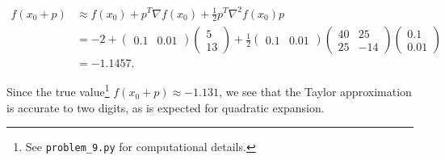 \begin{solution}
  \begin{align*}
    f(x_0 + p) &\approx f(x_0) + p^T \nabla f(x_0) + \frac{1}{2} p^T \nabla^2 f(x_0) p \\
               &= -2 + \begin{pmatrix}
                0.1 & 0.01
              \end{pmatrix}
              \begin{pmatrix}
                5 \\
                13
              \end{pmatrix} + \frac{1}{2} \begin{pmatrix}
                0.1 & 0.01
              \end{pmatrix}
              \begin{pmatrix}
                40 &  25 \\
                25 & -14
              \end{pmatrix}
              \begin{pmatrix}
                0.1 \\
                0.01
              \end{pmatrix} \\
              & = -1.1457.
  \end{align*}

  Since the true value\footnote{
    See \texttt{problem\_9.py} for computational details.
  } $f(x_0 + p) \approx -1.131 $, we see that the Taylor approximation is accurate to two
  digits, as is expected for quadratic expansion.
  \ \\
\end{solution}